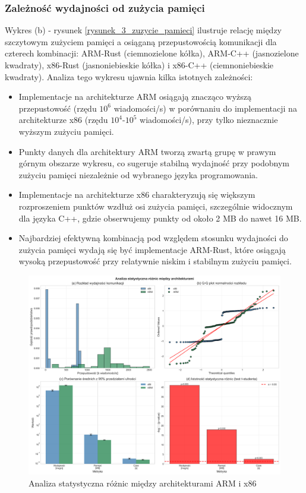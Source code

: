 \subsubsection{Zależność wydajności od zużycia pamięci}
Wykres (b) - rysunek \ref{rysunek_3_zuzycie_pamieci} ilustruje relację między szczytowym zużyciem pamięci a osiąganą przepustowością komunikacji dla czterech kombinacji: ARM-Rust (ciemnozielone kółka), ARM-C++ (jasnozielone kwadraty), x86-Rust (jasnoniebieskie kółka) i x86-C++ (ciemnoniebieskie kwadraty). Analiza tego wykresu ujawnia kilka istotnych zależności:
\begin{itemize}
    \item Implementacje na architekturze ARM osiągają znacząco wyższą przepustowość (rzędu $10^6$ wiadomości/s) w porównaniu do implementacji na architekturze x86 (rzędu $10^4$-$10^5$ wiadomości/s), przy tylko nieznacznie wyższym zużyciu pamięci.
    \item Punkty danych dla architektury ARM tworzą zwartą grupę w prawym górnym obszarze wykresu, co sugeruje stabilną wydajność przy podobnym zużyciu pamięci niezależnie od wybranego języka programowania.
    \item Implementacje na architekturze x86 charakteryzują się większym rozproszeniem punktów wzdłuż osi zużycia pamięci, szczególnie widocznym dla języka C++, gdzie obserwujemy punkty od około 2 MB do nawet 16 MB.
    \item Najbardziej efektywną kombinacją pod względem stosunku wydajności do zużycia pamięci wydają się być implementacje ARM-Rust, które osiągają wysoką przepustowość przy relatywnie niskim i stabilnym zużyciu pamięci.
\end{itemize}



\begin{figure}[H]
    \centering
    \includegraphics[width=\textwidth]{analiza/images/conc/pc/compare/rysunek_4_analiza_statystyczna.png}
    \caption{Analiza statystyczna różnic między architekturami ARM i x86}
    \label{rysunek_4_analiza_statystyczna}
\end{figure}

